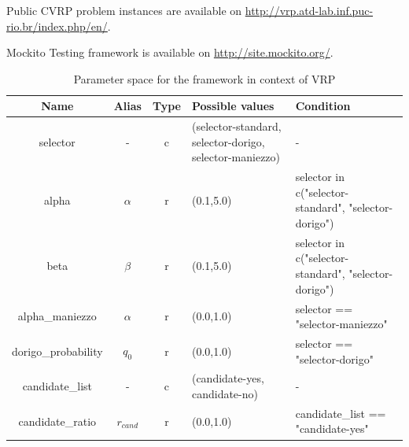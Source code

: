 \documentclass[12pt,a4paper,oneside]{book}
\begin{document}
Public CVRP problem instances are available on \url{http://vrp.atd-lab.inf.puc-rio.br/index.php/en/}.

Mockito Testing framework is available on \url{http://site.mockito.org/}.


\begin{table}[]
\centering
\caption{Parameter space for the framework in context of VRP}
\label{tbl:space}
\begin{tabular}{|c|c|c|p{4cm}|p{4cm}|}
\hline
\textbf{Name}  & \textbf{Alias}      & \textbf{Type} & \textbf{Possible values}                                                                & \textbf{Condition}                                                                                     \\ \hline
selector                        & -          & c    & (selector-standard, selector-dorigo, selector-maniezzo)                          & -                                                                                             \\ \hline
alpha                           & $\alpha$   & r    & (0.1,5.0)                                                                      & selector in c("selector-standard", "selector-dorigo")                                          \\ \hline
beta                            & $\beta$    & r    & (0.1,5.0)                                                                      & selector in c("selector-standard", "selector-dorigo")                                          \\ \hline
alpha\_maniezzo                 & $\alpha$   & r    & (0.0,1.0)                                                                      & selector == "selector-maniezzo"                                                               \\ \hline
dorigo\_probability             & $q_0$      & r    & (0.0,1.0)                                                                      & selector == "selector-dorigo"                                                                 \\ \hline
candidate\_list                 & -          & c    & (candidate-yes, candidate-no)                                                   & -                                                                                             \\ \hline
candidate\_ratio                & $r_{cand}$ & r    & (0.0,1.0)                                                                      & candidate\_list == "candidate-yes"                                                            \\ \hline

\end{tabular}
\end{table}
\end{document}
